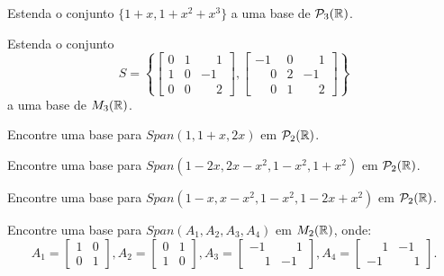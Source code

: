 \documentclass[12pt]{exam}
\begin{document}
    \begin{exercicio}
        Estenda o conjunto $\{1 + x, 1 + x^2 + x^3\}$ a uma base de $\mathcal{P}_3(\mathbb{R})$.
    \end{exercicio}

    \begin{exercicio}
        Estenda o conjunto
        \[
        S = \left\{
            \begin{bmatrix}
                0 & 1 & \phantom{-} 1\\
                1 & 0 & -1\\
                0 & 0 & \phantom{-} 2
            \end{bmatrix},
            \begin{bmatrix}
                -1 & 0 & \phantom{-} 1\\
                \phantom{-} 0 & 2 & -1\\
                \phantom{-} 0 & 1 & \phantom{-} 2
            \end{bmatrix}
        \right\}
        \]
        a uma base de $M_3(\mathbb{R})$.
    \end{exercicio}

    \begin{exercicio}
        Encontre uma base para $Span(1, 1 + x, 2x)$ em $\mathcal{P}_2(\mathbb{R})$.
    \end{exercicio}

    \begin{exercicio}
        Encontre uma base para $Span(1 - 2x, 2x - x^2, 1 - x^2, 1 + x^2)$ em $\mathcal{P}_2(\mathbb{R})$.
    \end{exercicio}

    \begin{exercicio}
        Encontre uma base para $Span(1 - x, x - x^2, 1 - x^2, 1 - 2x + x^2)$ em $\mathcal{P}_2(\mathbb{R})$.
    \end{exercicio}

    \begin{exercicio}
        Encontre uma base para $Span(A_1, A_2, A_3, A_4)$ em $M_2(\mathbb{R})$, onde:
        \[
            A_1 = \begin{bmatrix}
                1 & 0\\
                0 & 1
            \end{bmatrix},
            A_2 = \begin{bmatrix}
                0 & 1\\
                1 & 0
            \end{bmatrix},
            A_3 = \begin{bmatrix}
                -1 & \phantom{-} 1\\
                \phantom{-} 1 & -1
            \end{bmatrix},
            A_4 = \begin{bmatrix}
                \phantom{-} 1 & -1\\
                -1 & \phantom{-} 1
            \end{bmatrix}.
        \]
    \end{exercicio}


    


    
\end{document}
